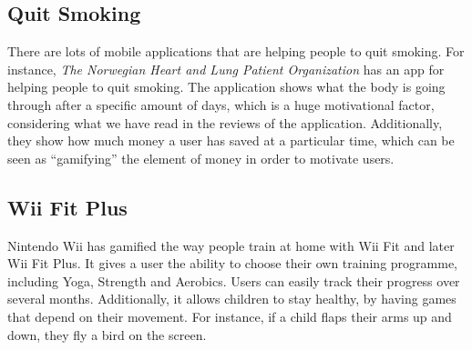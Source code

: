 \subsection{Quit Smoking}
There are lots of mobile applications that are helping people to quit smoking. For instance, \emph{The Norwegian Heart and Lung Patient Organization} has an app for helping people to quit smoking. The application shows what the body is going through after a specific amount of days, which is a huge motivational factor, considering what we have read in the reviews of the application. Additionally, they show how much money a user has saved at a particular time, which can be seen as ``gamifying'' the element of money in order to motivate users.  


\subsection{Wii Fit Plus}
Nintendo Wii has gamified the way people train at home with Wii Fit and later Wii Fit Plus. It gives a user the ability to choose their own training programme, including Yoga, Strength and Aerobics. Users can easily track their progress over several months. Additionally, it allows children to stay healthy, by having games that depend on their movement. For instance, if a child flaps their arms up and down, they fly a bird on the screen.    
 